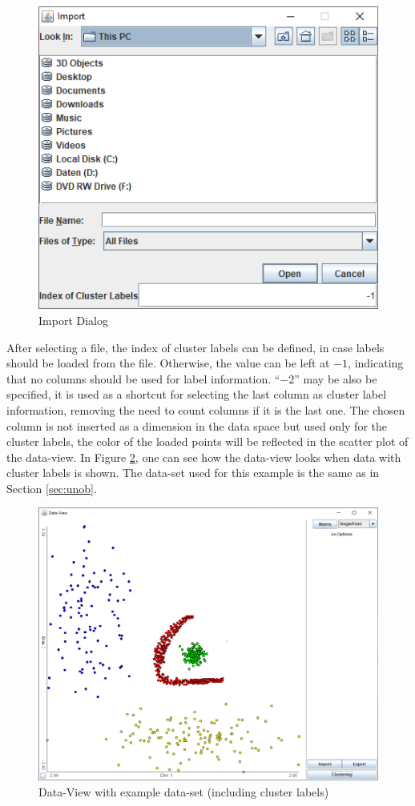 \documentclass[
	a4paper,
	english,
	twoside,
	openright,               
	11pt                            
	]{report}
\begin{document}
\begin{figure}[h]
	\centering 
	\includegraphics[scale=.45]{data-import}%
	\caption{Import Dialog}
	\label{fig:data-import}
\end{figure}

After selecting a file, the index of cluster labels can be defined, in case labels should be loaded from the file. Otherwise, the value can be left at $-1$, indicating that no columns should be used for label information. ``$-2$'' may be also be specified, it is used as a shortcut for selecting the last column as cluster label information, removing the need to count columns if it is the last one. The chosen column is not inserted as a dimension in the data space but used only for the cluster labels, the color of the loaded points will be reflected in the scatter plot of the data-view. In Figure \ref{fig:loaded-data}, one can see how the data-view looks when data with cluster labels is shown. The data-set used for this example is the same as in Section \ref{sec:unob}.

\begin{figure}[H]
	\centering
	\includegraphics[scale=.45]{unob}
	\caption{Data-View with example data-set (including cluster labels)}
	\label{fig:loaded-data}
\end{figure}
\end{document}
